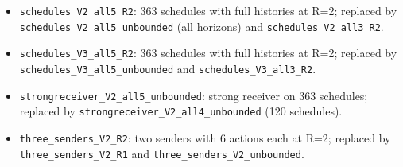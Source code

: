 \begin{itemize}
  \item {\small\nolinkurl{schedules_V2_all5_R2}}: 363 schedules with full histories at R=2; replaced by {\small\nolinkurl{schedules_V2_all5_unbounded}} (all horizons) and {\small\nolinkurl{schedules_V2_all3_R2}}.
  \item {\small\nolinkurl{schedules_V3_all5_R2}}: 363 schedules with full histories at R=2; replaced by {\small\nolinkurl{schedules_V3_all5_unbounded}} and {\small\nolinkurl{schedules_V3_all3_R2}}.
  \item {\small\nolinkurl{strongreceiver_V2_all5_unbounded}}: strong receiver on 363 schedules; replaced by {\small\nolinkurl{strongreceiver_V2_all4_unbounded}} (120 schedules).
  \item {\small\nolinkurl{three_senders_V2_R2}}: two senders with 6 actions each at R=2; replaced by {\small\nolinkurl{three_senders_V2_R1}} and {\small\nolinkurl{three_senders_V2_unbounded}}.
\end{itemize}
